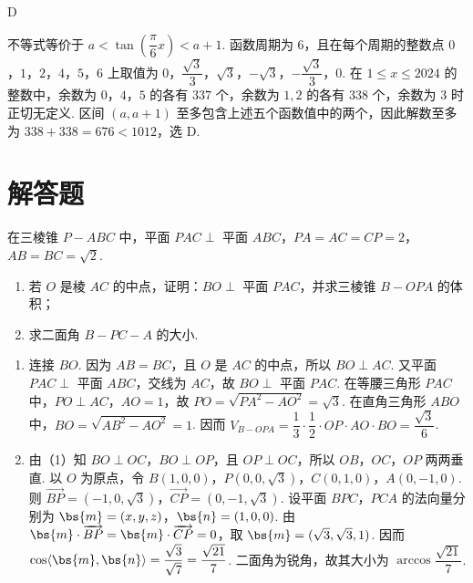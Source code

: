 \begin{answer}
D
\end{answer}

\begin{solution}
不等式等价于 \(a<\tan\left(\dfrac\pi6x\right)<a+1\). 函数周期为 \(6\)，且在每个周期的整数点 \(0\)，\(1\)，\(2\)，\(4\)，\(5\)，\(6\) 上取值为 \(0\)，\(\dfrac{\sqrt3}{3}\)，\(\sqrt3\)，\(-\sqrt3\)，\(-\dfrac{\sqrt3}{3}\)，\(0\). 在 \(1\le x\le2024\) 的整数中，余数为 \(0\)，\(4\)，\(5\) 的各有 \(337\) 个，余数为 \(1,2\) 的各有 \(338\) 个，余数为 \(3\) 时正切无定义. 区间 \((a,a+1)\) 至多包含上述五个函数值中的两个，因此解数至多为 \(338+338=676<1012\)，选 D.
\end{solution}

\section{解答题}

\begin{problem}
在三棱锥 \(P-ABC\) 中，平面 \(PAC\perp\) 平面 \(ABC\)，\(PA=AC=CP=2\)，\(AB=BC=\sqrt2\).

\begin{enumerate}
\item 若 \(O\) 是棱 \(AC\) 的中点，证明：\(BO\perp\) 平面 \(PAC\)，并求三棱锥 \(B-OPA\) 的体积；
\item 求二面角 \(B-PC-A\) 的大小.
\end{enumerate}

\end{problem}

\begin{solution}
\begin{enumerate}
\item 连接 \(BO\). 因为 \(AB=BC\)，且 \(O\) 是 \(AC\) 的中点，所以 \(BO\perp AC\). 又平面 \(PAC\perp\) 平面 \(ABC\)，交线为 \(AC\)，故 \(BO\perp\) 平面 \(PAC\). 在等腰三角形 \(PAC\) 中，\(PO\perp AC\)，\(AO=1\)，故 \(PO=\sqrt{PA^2-AO^2}=\sqrt3\). 在直角三角形 \(ABO\) 中，\(BO=\sqrt{AB^2-AO^2}=1\). 因而 \(V_{B-OPA}=\dfrac13\cdot\dfrac12\cdot OP\cdot AO\cdot BO=\dfrac{\sqrt3}{6}\).
\item 由（1）知 \(BO\perp OC\)，\(BO\perp OP\)，且 \(OP\perp OC\)，所以 \(OB\)，\(OC\)，\(OP\) 两两垂直. 以 \(O\) 为原点，令 \(B(1,0,0)\)，\(P(0,0,\sqrt3)\)，\(C(0,1,0)\)，\(A(0,-1,0)\). 则
\(\overrightarrow{BP}=(-1,0,\sqrt3)\)，\(\overrightarrow{CP}=(0,-1,\sqrt3)\). 设平面 \(BPC\)，\(PCA\) 的法向量分别为 \(\bs{m}=(x,y,z)\)，\(\bs{n}=(1,0,0)\). 由 \(\bs{m}\cdot\overrightarrow{BP}=\bs{m}\cdot\overrightarrow{CP}=0\)，取 \(\bs{m}=(\sqrt3,\sqrt3,1)\). 因而 \(\cos\langle\bs{m},\bs{n}\rangle=\dfrac{\sqrt3}{\sqrt7}=\dfrac{\sqrt{21}}7\). 二面角为锐角，故其大小为 \(\arccos\dfrac{\sqrt{21}}7\).
\end{enumerate}
\end{solution}

